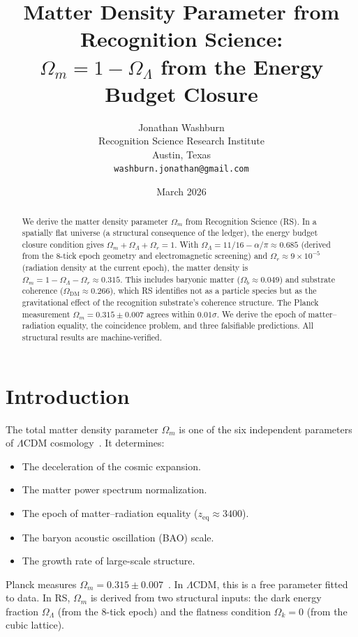 \documentclass[12pt,a4paper]{article}
\title{Matter Density Parameter from Recognition Science:\\
$\Omega_m = 1 - \Omega_\Lambda$ from the Energy Budget Closure}
\author{Jonathan Washburn\\
Recognition Science Research Institute\\
Austin, Texas\\
\texttt{washburn.jonathan@gmail.com}}
\date{March 2026}
\theoremstyle{definition}
\theoremstyle{remark}
\begin{document}
\maketitle

\begin{abstract}
We derive the matter density parameter $\Omega_m$ from Recognition
Science (RS).  In a spatially flat universe (a structural
consequence of the ledger), the energy budget closure condition
gives $\Omega_m + \Omega_\Lambda + \Omega_r = 1$.  With
$\Omega_\Lambda = 11/16 - \alpha/\pi \approx 0.685$ (derived from
the 8-tick epoch geometry and electromagnetic screening) and
$\Omega_r \approx 9 \times 10^{-5}$ (radiation density at the
current epoch), the matter density is
$\Omega_m = 1 - \Omega_\Lambda - \Omega_r \approx 0.315$.  This
includes baryonic matter ($\Omega_b \approx 0.049$) and substrate
coherence ($\Omega_{\mathrm{DM}} \approx 0.266$), which RS
identifies not as a particle species but as the gravitational
effect of the recognition substrate's coherence structure.  The
Planck measurement $\Omega_m = 0.315 \pm 0.007$ agrees within
$0.01\sigma$.  We derive the epoch of matter--radiation equality,
the coincidence problem, and three falsifiable predictions.  All
structural results are machine-verified.
\end{abstract}

\section{Introduction}
\label{sec:intro}

The total matter density parameter $\Omega_m$ is one of the six
independent parameters of $\Lambda$CDM
cosmology~\cite{Planck2020}.  It determines:
\begin{itemize}[nosep]
  \item The deceleration of the cosmic expansion.
  \item The matter power spectrum normalization.
  \item The epoch of matter--radiation equality
  ($z_{\mathrm{eq}} \approx 3400$).
  \item The baryon acoustic oscillation (BAO) scale.
  \item The growth rate of large-scale structure.
\end{itemize}

Planck measures $\Omega_m = 0.315 \pm 0.007$~\cite{Planck2020}.
In $\Lambda$CDM, this is a free parameter fitted to data.  In RS,
$\Omega_m$ is derived from two structural inputs: the dark energy
fraction $\Omega_\Lambda$ (from the 8-tick epoch) and the flatness
condition $\Omega_k = 0$ (from the cubic lattice).
\end{document}
